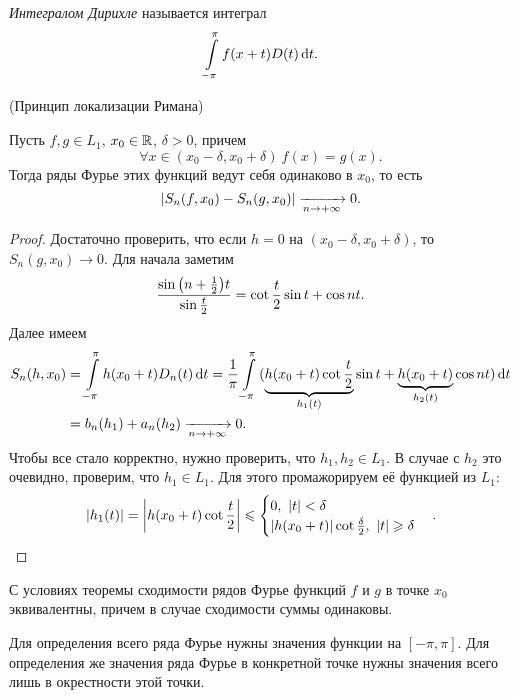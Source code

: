 \begin{definition}
    \textit{Интегралом Дирихле} называется интеграл
    \[
        \intl_{-\pi}^\pi{f(x + t) D(t) \dd t}
    .\]
\end{definition}

\begin{theorem}(Принцип локализации Римана)

    Пусть $f, g \in L_1$, $x_0 \in \R$, $\delta > 0$, причем
    \[
        \forall x \in (x_0 - \delta, x_0 + \delta)~ f(x) = g(x)
    .\]
    Тогда ряды Фурье этих функций ведут себя одинаково в $x_0$, то есть
    \[
        \abs*{S_n(f, x_0) - S_n(g, x_0)} \xrightarrow[n \to +\infty]{} 0
    .\]
\end{theorem}
\begin{proof}
    Достаточно проверить, что если $h = 0$ на $(x_0 - \delta, x_0 + \delta)$,
    то $S_n(g, x_0) \to 0$. Для начала заметим
    \[
        \frac{\sin{\parens*{n + \frac{1}{2}} t}}{\sin{\frac{t}{2}}} =
        \cot{\frac{t}{2}} \sin{t} + \cos{nt}
    .\]
    Далее имеем
    \begin{align*}
        S_n(h, x_0) 
        &= \intl_{-\pi}^\pi{h(x_0 + t) D_n(t) \dd t} =
        \frac{1}{\pi} \intl_{-\pi}^\pi{(\underbrace{h(x_0 + t) \cot{\frac{t}{2}}}_{h_1(t)}
        \sin{t} + \underbrace{h(x_0 + t)}_{h_2(t)} \cos{nt}) \dd t} \\ 
        &= b_n(h_1) + a_n(h_2) \xrightarrow[n \to +\infty]{} 0
    .\end{align*}
    Чтобы все стало корректно, нужно проверить, что $h_1, h_2 \in L_1$. В случае
    с $h_2$ это очевидно, проверим, что $h_1 \in L_1$. Для этого промажорируем
    её функцией из $L_1$:
    \[
        |h_1(t)| = \abs*{h(x_0 + t) \cot{\frac{t}{2}}} \leqslant \begin{cases}
            0,~ |t| < \delta \\
            |h(x_0 + t)| \cot{\frac{\delta}{2}},~ |t| \geqslant \delta
        \end{cases}
    .\]
\end{proof}

\begin{corollary}
    С условиях теоремы сходимости рядов Фурье функций $f$ и $g$ в точке $x_0$
    эквивалентны, причем в случае сходимости суммы одинаковы.
\end{corollary}

\begin{remark}
    Для определения всего ряда Фурье нужны значения функции на $[-\pi, \pi]$.
    Для определения же значения ряда Фурье в конкретной точке нужны значения
    всего лишь в окрестности этой точки.
\end{remark}

